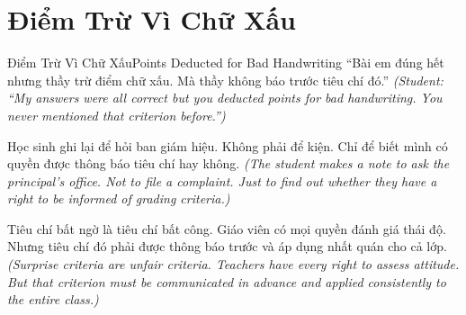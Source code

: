 \section{Điểm Trừ Vì Chữ Xấu}
\begin{truyen}{Điểm Trừ Vì Chữ Xấu}{Points Deducted for Bad Handwriting}
 ``Bài em đúng hết nhưng thầy trừ điểm chữ xấu. Mà thầy không báo trước tiêu chí đó.''
\textit{(Student: ``My answers were all correct but you deducted points for bad handwriting. You never mentioned that criterion before.'')}




Học sinh ghi lại để hỏi ban giám hiệu. Không phải để kiện. Chỉ để biết mình có quyền được thông báo tiêu chí hay không.
\textit{(The student makes a note to ask the principal's office. Not to file a complaint. Just to find out whether they have a right to be informed of grading criteria.)}

\begin{baihoc}
Tiêu chí bất ngờ là tiêu chí bất công. Giáo viên có mọi quyền đánh giá thái độ. Nhưng tiêu chí đó phải được thông báo trước và áp dụng nhất quán cho cả lớp.
\textit{(Surprise criteria are unfair criteria. Teachers have every right to assess attitude. But that criterion must be communicated in advance and applied consistently to the entire class.)}
\end{baihoc}
\end{truyen}

